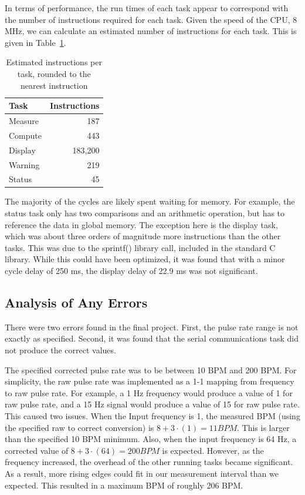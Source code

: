 \documentclass[12pt]{article} %
\begin{document}
    In terms of performance, the run times of each task appear to correspond with
    the number of instructions required for each task. Given the speed of the CPU,
    8 MHz, we can calculate an estimated number of instructions for each task.
    This is given in Table~\ref{tab:instr}.
    \begin{table}[h]
      \centering
      \begin{tabular}{|l|r|} 
	\hline
	Task & Instructions \\ \hline
	Measure & 187 \\ \hline
	Compute & 443 \\ \hline
	Display & 183,200 \\ \hline
	Warning & 219 \\ \hline
	Status & 45 \\ \hline
      \end{tabular}
      \caption{Estimated instructions per task, rounded to the nearest instruction}
      \label{tab:instr}
    \end{table}
    The majority of the cycles are likely spent waiting for memory. For example,
    the status task only has two comparisons and an arithmetic operation, but has
    to reference the data in global memory. The exception here is the display
    task, which was about three orders of magnitude more instructions than the
    other tasks. This was due to the sprintf() library call, included in the
    standard C library. While this could have been optimized, it was found that
    with a minor cycle delay of 250 ms, the display delay of 22.9 ms was not
    significant.


    \subsection{Analysis of Any Errors}
    
    There were two errors found in the final project.  First, the pulse rate
    range is not exactly as specified.  Second, it was found that the serial
    communications task did not produce the correct values.

    The specified corrected pulse rate was to be between 10 BPM and 200 BPM.
    For simplicity, the raw pulse rate was implemented as a 1-1 mapping from
    frequency to raw pulse rate.  For example, a 1 Hz frequency would produce a
    value of 1 for raw pulse rate, and a 15 Hz signal would produce a value of
    15 for raw pulse rate.  This caused two issues.  When the Input frequency
    is 1, the measured BPM (using the specified raw to correct conversion) is
    $8 + 3\cdot(1) = 11 BPM$.  This is larger than the specified 10 BPM
    minimum.  Also, when the input frequency is 64 Hz, a corrected value of 
    $8 + 3\cdot(64) = 200 BPM$ is expected.  However, as the frequency
    increased, the overhead of the other running tasks became significant.
    As a result, more rising edges could fit in our measurement interval
    than we expected.  This resulted in a maximum BPM of roughly 206 BPM.
\end{document}
